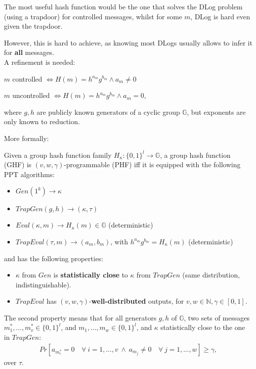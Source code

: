 \documentclass[oneside]{book}
\newcommand{\N}[0]{\mathbb{N}}
\newcommand{\G}[0]{\mathbb{G}}
\begin{document}
The most useful hash function would be the one that solves the DLog problem (using a trapdoor) for controlled messages, whilst for some $m$, DLog is hard even given the trapdoor.

However, this is hard to achieve, as knowing most DLogs usually allows to infer it for \textbf{all} messages.\\

A refinement is needed:

$m$ controlled $\iff H(m) = h^{a_m}g^{b_m} \land a_m \neq 0$

$m$ uncontrolled $\iff H(m) = h^{a_m}g^{b_m} \land a_m = 0$,

where $g, h$ are publicly known generators of a cyclic group $\G$, but exponents are only known to reduction.

More formally:

Given a group hash function family $H_\kappa : \{0,1\}^l \rightarrow \G$, a group hash function (GHF) is $(v, w, \gamma)$-programmable (PHF) iff it is equipped with the following PPT algorithms:
\begin{itemize}
    \item $Gen(1^k) \rightarrow \kappa$
    \item $TrapGen(g, h) \rightarrow (\kappa, \tau)$
    \item $Eval(\kappa, m) \rightarrow H_\kappa(m) \in \G$ (deterministic)
    \item $TrapEval(\tau, m) \rightarrow (a_m, b_m)$, with $h^{a_m}g^{b_m} = H_\kappa(m)$ (deterministic)
\end{itemize}

and has the following properties:
\begin{itemize}
    \item $\kappa$ from $Gen$ is \textbf{statistically close} to $\kappa$ from $TrapGen$ (same distribution, indistinguishable).
    \item $TrapEval$ has $(v, w, \gamma)$-\textbf{well-distributed} outputs, for $v, w \in \N, \gamma \in [0,1]$.
\end{itemize}

The second property means that for all generators $g, h$ of $\G$, two sets of messages $m_1^*, ..., m_v^* \in \{0,1\}^l$, and $m_1, ..., m_w \in \{0,1\}^l$, and $\kappa$ statistically close to the one in $TrapGen$:
\begin{align}
    Pr[a_{m_i^*} = 0\quad \forall\ i = 1,...,v\ \land\ a_{m_j} \neq 0\quad \forall\ j = 1,...,w] \ge \gamma,
\end{align}
over $\tau$.
\end{document}
